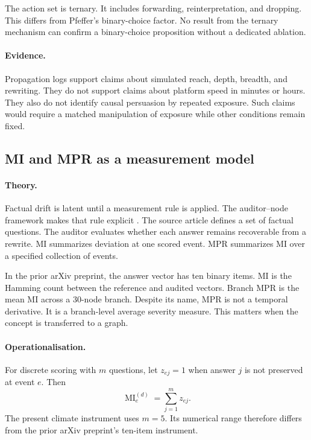 The action set is ternary.
It includes forwarding, reinterpretation, and dropping.
This differs from Pfeffer's binary-choice factor.
No result from the ternary mechanism can confirm a binary-choice proposition without a dedicated ablation.

\paragraph{Evidence.}
Propagation logs support claims about simulated reach, depth, breadth, and rewriting.
They do not support claims about platform speed in minutes or hours.
They also do not identify causal persuasion by repeated exposure.
Such claims would require a matched manipulation of exposure while other conditions remain fixed.

\subsection{MI and MPR as a measurement model}
\label{subsec:mi-mpr}

\paragraph{Theory.}
Factual drift is latent until a measurement rule is applied.
The auditor--node framework makes that rule explicit \parencite{maurya2025simulating}.
The source article defines a set of factual questions.
The auditor evaluates whether each answer remains recoverable from a rewrite.
MI summarizes deviation at one scored event.
MPR summarizes MI over a specified collection of events.

In the prior arXiv preprint, the answer vector has ten binary items.
MI is the Hamming count between the reference and audited vectors.
Branch MPR is the mean MI across a 30-node branch.
Despite its name, MPR is not a temporal derivative.
It is a branch-level average severity measure.
This matters when the concept is transferred to a graph.

\paragraph{Operationalisation.}
For discrete scoring with \(m\) questions, let \(z_{ej}=1\) when answer \(j\) is not preserved at event \(e\).
Then
\begin{equation}
\operatorname{MI}^{(d)}_e
=
\sum_{j=1}^{m} z_{ej}.
\label{eq:discrete-mi}
\end{equation}
The present climate instrument uses \(m=5\).
Its numerical range therefore differs from the prior arXiv preprint's ten-item instrument.


